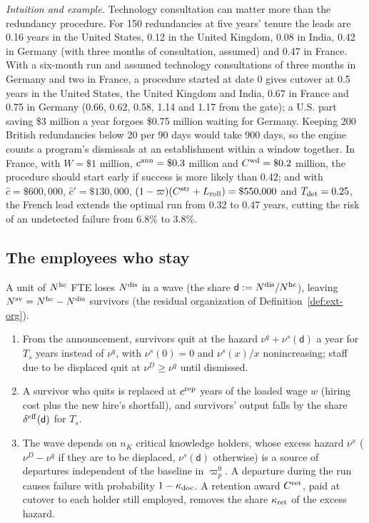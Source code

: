 \noindent\emph{Intuition and example.} Technology consultation can matter more than the redundancy procedure. For 150 redundancies at five years' tenure the leads are 0.16 years in the United States, 0.12 in the United Kingdom, 0.08 in India, 0.42 in Germany (with three months of consultation, assumed) and 0.47 in France. With a six-month run and assumed technology consultations of three months in Germany and two in France, a procedure started at date 0 gives cutover at 0.5 years in the United States, the United Kingdom and India, 0.67 in France and 0.75 in Germany (0.66, 0.62, 0.58, 1.14 and 1.17 from the gate); a U.S. part saving \$3 million a year forgoes \$0.75 million waiting for Germany. Keeping 200 British redundancies below 20 per 90 days would take 900 days, so the engine counts a program's dismissals at an establishment within a window together. In France, with $W=\$1$ million, $c^{\rm ann}=\$0.3$ million and $C^{\rm wd}=\$0.2$ million, the procedure should start early if success is more likely than 0.42; and with $\hat c=\$600{,}000$, $\hat c'=\$130{,}000$, $(1-\varpi)(C^{\rm str}+L_{\rm roll})=\$550{,}000$ and $T_{\rm det}=0.25$, the French lead extends the optimal run from 0.32 to 0.47 years, cutting the risk of an undetected failure from 6.8\% to 3.8\%.

\subsection{The employees who stay}\label{sec:labor-survivors}

\begin{assumption}\label{ass:labor-survivor}
A unit of $N^{\rm hc}$ FTE loses $N^{\rm dis}$ in a wave (the share $\mathsf d:=N^{\rm dis}/N^{\rm hc}$), leaving $N^{\rm sv}=N^{\rm hc}-N^{\rm dis}$ survivors (the residual organization of Definition~\ref{def:ext-org}).
\begin{enumerate}
\item[(i)] From the announcement, survivors quit at the hazard $\nu^q+\nu^s(\mathsf d)$ a year for $T_s$ years instead of $\nu^q$, with $\nu^s(0)=0$ and $\nu^s(x)/x$ nonincreasing; staff due to be displaced quit at $\nu^D\ge\nu^q$ until dismissed.
\item[(ii)] A survivor who quits is replaced at $c^{\rm rep}$ years of the loaded wage $w$ (hiring cost plus the new hire's shortfall), and survivors' output falls by the share $\delta^{\rm eff}(\mathsf d)$ for $T_s$.
\item[(iii)] The wave depends on $n_K$ critical knowledge holders, whose excess hazard $\nu^x$ ($\nu^D-\nu^q$ if they are to be displaced, $\nu^s(\mathsf d)$ otherwise) is a source of departures independent of the baseline in $\varpi^0_p$. A departure during the run causes failure with probability $1-\kappa_{\rm doc}$. A retention award $C^{\rm ret}$, paid at cutover to each holder still employed, removes the share $\kappa_{\rm ret}$ of the excess hazard.
\end{enumerate}
\end{assumption}


